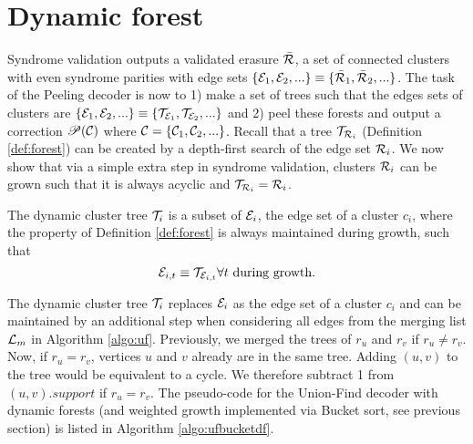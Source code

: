 

\section{Dynamic forest}
Syndrome validation outputs a validated erasure $\bar{\mathcal{R}}$, a set of connected clusters with even syndrome parities with edge sets $\{\mathcal{E}_1, \mathcal{E}_2, ...\} \equiv \{\bar{\mathcal{R}}_1, \bar{\mathcal{R}}_2, ...\}$. The task of the Peeling decoder is now to 1) make a set of trees such that the edges sets of clusters are $\{\mathcal{E}_1, \mathcal{E}_2, ...\} \equiv \{\mathcal{T}_{\mathcal{E}_1}, \mathcal{T}_{\mathcal{E}_2}, ...\}$ and 2) peel these forests and output a correction $\mathscr{P}(\mathcal{C})$ where $\mathcal{C} = \{\mathcal{C}_1, \mathcal{C}_2,...\}$. Recall that a tree $\mathcal{T}_{\mathcal{R}_i}$ (Definition \ref{def:forest}) can be created by a depth-first search of the edge set $\mathcal{R}_i$. We now show that via a simple extra step in syndrome validation, clusters $\mathcal{R}_i$ can be grown such that it is always acyclic and $\mathcal{T}_{\mathcal{R}_i} = \mathcal{R}_i$. 

\begin{definition}
  The dynamic cluster tree $\mathcal{T}_i$ is a subset of $\mathcal{E}_i$, the edge set of a cluster $c_i$, where the property of Definition \ref{def:forest} is always maintained during growth, such that
  \begin{equation}
    \mathcal{E}_{i,t}\equiv\mathcal{T}_{\mathcal{E}_{i,t}} \forall t \text{ during growth}.
  \end{equation}
\end{definition}
The dynamic cluster tree $\mathcal{T}_i$ replaces $\mathcal{E}_i$ as the edge set of a cluster $c_i$ and can be maintained by an additional step when considering all edges from the merging list $\mathcal{L}_m$ in Algorithm \ref{algo:uf}. Previously, we merged the trees of $r_u$ and $r_v$ if $r_u \neq r_v$. Now, if $r_u = r_v$, vertices $u$ and $v$ already are in the same tree. Adding $(u,v)$ to the tree would be equivalent to a cycle. We therefore subtract 1 from $(u,v).support$ if $r_u = r_v$. The pseudo-code for the Union-Find decoder with dynamic forests (and weighted growth implemented via Bucket sort, see previous section) is listed in Algorithm \ref{algo:ufbucketdf}.

